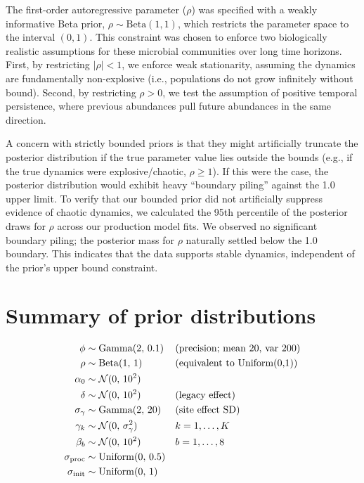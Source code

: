 \documentclass[11pt]{article}
\begin{document}
The first-order autoregressive parameter ($\rho$) was specified with a weakly informative Beta prior, $\rho \sim \mathrm{Beta}(1, 1)$, which restricts the parameter space to the interval $(0, 1)$. This constraint was chosen to enforce two biologically realistic assumptions for these microbial communities over long time horizons. First, by restricting $|\rho| < 1$, we enforce weak stationarity, assuming the dynamics are fundamentally non-explosive (i.e., populations do not grow infinitely without bound). Second, by restricting $\rho > 0$, we test the assumption of positive temporal persistence, where previous abundances pull future abundances in the same direction.

A concern with strictly bounded priors is that they might artificially truncate the posterior distribution if the true parameter value lies outside the bounds (e.g., if the true dynamics were explosive/chaotic, $\rho \ge 1$). If this were the case, the posterior distribution would exhibit heavy ``boundary piling'' against the 1.0 upper limit. To verify that our bounded prior did not artificially suppress evidence of chaotic dynamics, we calculated the 95th percentile of the posterior draws for $\rho$ across our production model fits. We observed no significant boundary piling; the posterior mass for $\rho$ naturally settled below the 1.0 boundary. This indicates that the data supports stable dynamics, independent of the prior's upper bound constraint.


\section{Summary of prior distributions}

\begin{align}
\phi &\sim \mathrm{Gamma}(2,\, 0.1) & &\text{(precision; mean 20, var 200)} \notag\\
\rho &\sim \mathrm{Beta}(1,\, 1) & &\text{(equivalent to Uniform(0,1))} \notag\\
\alpha_0 &\sim \mathcal{N}(0,\, 10^2) \notag\\
\delta &\sim \mathcal{N}(0,\, 10^2) & &\text{(legacy effect)} \notag\\
\sigma_{\gamma} &\sim \mathrm{Gamma}(2,\, 20) & &\text{(site effect SD)} \notag\\
\gamma_k &\sim \mathcal{N}(0,\, \sigma_{\gamma}^2) & &k = 1,\dots,K \notag\\
\beta_b &\sim \mathcal{N}(0,\, 10^2) & &b = 1,\dots,8 \notag\\
\sigma_{\mathrm{proc}} &\sim \mathrm{Uniform}(0,\, 0.5) \notag\\
\sigma_{\mathrm{init}} &\sim \mathrm{Uniform}(0,\, 1) \notag
\end{align}
\end{document}
